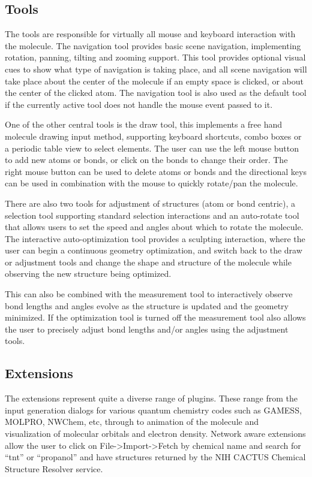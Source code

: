 \documentclass[10pt]{bmc_article}
\newenvironment{bmcformat}{\begin{raggedright}
\baselineskip20pt\sloppy\setboolean{publ}{false}}{\end{raggedright}
\baselineskip20pt\sloppy}
\begin{document}
\begin{bmcformat}
\subsection{Tools}

The tools are responsible for virtually all mouse and keyboard interaction with
the molecule. The navigation tool provides basic scene navigation, implementing
rotation, panning, tilting and zooming support. This tool provides optional
visual cues to show what type of navigation is taking place, and all scene
navigation will take place about the center of the molecule if an empty space is
clicked, or about the center of the clicked atom. The navigation tool is also
used as the default tool if the currently active tool does not handle the mouse
event passed to it.

One of the other central tools is the draw tool, this implements a free hand
molecule drawing input method, supporting keyboard shortcuts, combo boxes or a
periodic table view to select elements. The user can use the left mouse button
to add new atoms or bonds, or click on the bonds to change their order. The
right mouse button can be used to delete atoms or bonds and the directional keys
can be used in combination with the mouse to quickly rotate/pan the molecule.

There are also two tools for adjustment of structures (atom or bond centric), a
selection tool supporting standard selection interactions and an auto-rotate
tool that allows users to set the speed and angles about which to rotate the
molecule. The interactive auto-optimization tool provides a sculpting
interaction, where the user can begin a continuous geometry optimization, and
switch back to the draw or adjustment tools and change the shape and structure
of the molecule while observing the new structure being optimized.

This can also be combined with the measurement tool to interactively observe
bond lengths and angles evolve as the structure is updated and the geometry
minimized. If the optimization tool is turned off the measurement tool also
allows the user to precisely adjust bond lengths and/or angles using the
adjustment tools.

\subsection{Extensions}

The extensions represent quite a diverse range of plugins. These range from the
input generation dialogs for various quantum chemistry codes such as GAMESS,
MOLPRO, NWChem, etc, through to animation of the molecule and visualization of
molecular orbitals and electron density. Network aware extensions allow the user
to click on File->Import->Fetch by chemical name and search for ``tnt'' or
``propanol'' and have structures returned by the NIH CACTUS Chemical Structure
Resolver service.


\end{bmcformat}
\end{document}
